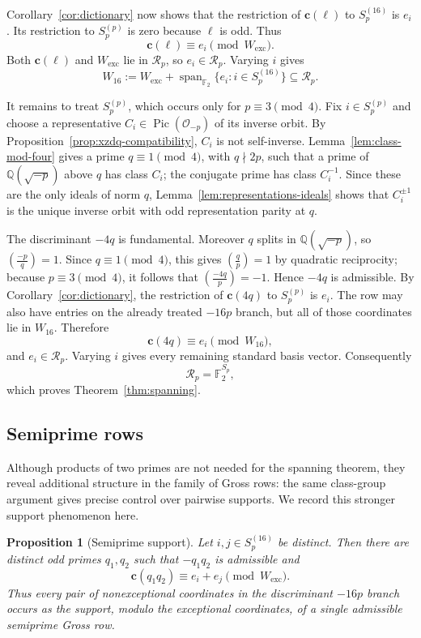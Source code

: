 \documentclass[10pt,a4paper]{amsart}
\newtheorem{proposition}[theorem]{Proposition}
\newcommand{\Q}{\mathbb{Q}}
\newcommand{\F}{\mathbb{F}}
\newcommand{\OO}{\mathcal{O}}
\newcommand{\Pic}{\operatorname{Pic}}
\newcommand{\Span}{\operatorname{span}}
\newcommand{\leg}[2]{\left(\frac{#1}{#2}\right)}
\newcommand{\crow}{\mathbf{c}}
\newcommand{\Rp}{\mathcal{R}_p}
\begin{document}
Corollary~\ref{cor:dictionary} now shows that the restriction of $\crow(\ell)$ to $S_p^{(16)}$ is $e_i$.  Its restriction to $S_p^{(p)}$ is zero because $\ell$ is odd.  Thus
\[
  \crow(\ell)\equiv e_i\pmod{W_{\mathrm{exc}}}.
\]
Both $\crow(\ell)$ and $W_{\mathrm{exc}}$ lie in $\Rp$, so $e_i\in\Rp$.  Varying $i$ gives
\[
  W_{16}:=W_{\mathrm{exc}}+
  \Span_{\F_2}\{e_i:i\in S_p^{(16)}\}
  \subseteq\Rp.
\]


It remains to treat $S_p^{(p)}$, which occurs only for $p\equiv3\pmod4$.  Fix $i\in S_p^{(p)}$ and choose a representative $C_i\in\Pic(\OO_{-p})$ of its inverse orbit.  By Proposition~\ref{prop:xzdq-compatibility}, $C_i$ is not self-inverse.  Lemma~\ref{lem:class-mod-four} gives a prime $q\equiv1\pmod4$, with $q\nmid2p$, such that a prime of $\Q(\sqrt{-p})$ above $q$ has class $C_i$; the conjugate prime has class $C_i^{-1}$.  Since these are the only ideals of norm $q$, Lemma~\ref{lem:representations-ideals} shows that $C_i^{\pm1}$ is the unique inverse orbit with odd representation parity at $q$.

The discriminant $-4q$ is fundamental. Moreover $q$ splits in $\Q(\sqrt{-p})$, so $\leg{-p}{q}=1$. Since $q\equiv1\pmod4$, this gives $\leg{q}{p}=1$ by quadratic reciprocity; because $p\equiv3\pmod4$, it follows that $\leg{-4q}{p}=-1$.  Hence $-4q$ is admissible.  By Corollary~\ref{cor:dictionary}, the restriction of $\crow(4q)$ to $S_p^{(p)}$ is $e_i$.  The row may also have entries on the already treated $-16p$ branch, but all of those coordinates lie in $W_{16}$.  Therefore
\[
  \crow(4q)\equiv e_i\pmod{W_{16}},
\]
and $e_i\in\Rp$.  Varying $i$ gives every remaining standard basis vector.  Consequently
\[
  \Rp=\F_2^{S_p},
\]
which proves Theorem~\ref{thm:spanning}.

\subsection{Semiprime rows}

Although products of two primes are not needed for the spanning theorem,
they reveal additional structure in the family of Gross rows: the same
class-group argument gives precise control over pairwise supports. We record
this stronger support phenomenon here.

\begin{proposition}[Semiprime support]
\label{prop:semiprime-support}
Let $i,j\in S_p^{(16)}$ be distinct. Then there are distinct odd primes
$q_1,q_2$ such that $-q_1q_2$ is admissible and
\[
  \crow(q_1q_2)\equiv e_i+e_j\pmod{W_{\mathrm{exc}}}.
\]
Thus every pair of nonexceptional coordinates in the discriminant $-16p$
branch occurs as the support, modulo the exceptional coordinates, of a
single admissible semiprime Gross row.
\end{proposition}
\end{document}
